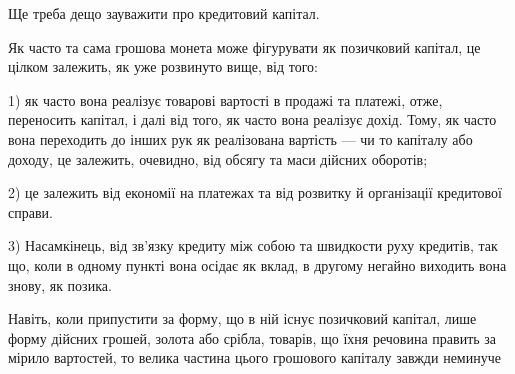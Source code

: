 Ще треба дещо зауважити про кредитовий капітал.

Як часто та сама грошова монета може фігурувати як позичковий капітал,
це цілком залежить, як уже розвинуто вище, від того:

1) як часто вона реалізує товарові вартості в продажі та платежі, отже,
переносить капітал, і далі від того, як часто вона реалізує дохід. Тому, як
часто вона переходить до інших рук як реалізована вартість — чи то капіталу
або доходу, це залежить, очевидно, від обсягу та маси дійсних оборотів;

2) це залежить від економії на платежах та від розвитку й організації
кредитової справи.

3) Насамкінець, від зв’язку кредиту між собою та швидкости руху кредитів,
так що, коли в одному пункті вона осідає як вклад, в другому негайно
виходить вона знову, як позика.

Навіть, коли припустити за форму, що в ній існує позичковий капітал, лише
форму дійсних грошей, золота або срібла, товарів, що їхня речовина править за
мірило вартостей, то велика частина цього грошового капіталу завжди неминуче
